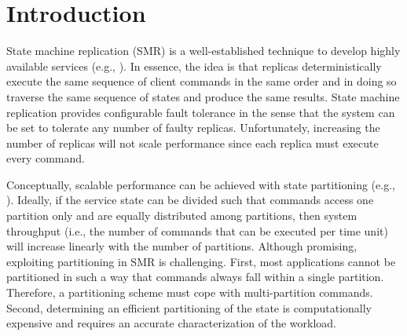 \section{Introduction}


State machine replication (SMR) is a well-established technique to develop highly available services (e.g., \cite{Shvachko:2003,Ghemawat:2003,Burrows:2006,MacCormick:2004}).
In essence, the idea is that replicas deterministically execute the same sequence of client commands in the same order and in doing so traverse the same sequence of states and produce the same results.
State machine replication provides configurable fault tolerance in the sense that the system can be set to tolerate any number of faulty replicas.
Unfortunately, increasing the number of replicas will not scale performance since each replica must execute every command.

Conceptually, scalable performance can be achieved with state partitioning (e.g., \cite{facebookTAO, sciascia2012sdur, Aguilera:2007}).
Ideally, if the service state can be divided such that commands access one partition only and are equally distributed among partitions, then system throughput (i.e., the number of commands that can be executed per time unit) will increase linearly with the number of partitions.
Although promising, exploiting partitioning in SMR is challenging.
First, most applications cannot be partitioned in such a way that commands always fall within a single partition.
Therefore, a partitioning scheme must cope with multi-partition commands.
Second, determining an efficient partitioning of the state is computationally expensive and requires an accurate characterization of the workload.

